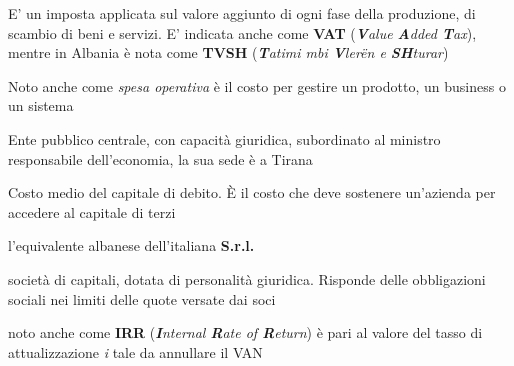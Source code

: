 \begin{acronym}
\begin{multicols}{2}
		   {\newline \small E' un imposta applicata sul valore aggiunto di ogni fase della produzione, di scambio di beni e servizi. E' indicata anche come \textbf{VAT} (\textit{\textbf{V}alue \textbf{A}dded \textbf{T}ax}), mentre in Albania è nota come \textbf{TVSH} (\textit{\textbf{T}atimi mbi \textbf{V}ler\"en e \textbf{SH}turar}) \par}

		   {\newline \small Noto anche come \textit{spesa operativa} è il costo per gestire un prodotto, un business o un sistema \par}

		   {\newline \small Ente pubblico centrale, con capacità giuridica, subordinato al ministro responsabile dell'economia, la sua sede è a Tirana\par}

		   {\newline \small Costo medio del capitale di debito. \`E il costo che deve sostenere un'azienda per accedere al capitale di terzi\par}

		   {\newline \small l'equivalente albanese dell'italiana \textbf{\ac{S.r.l.}}\par}

		   {\newline \small società di capitali, dotata di personalità giuridica. Risponde delle obbligazioni sociali nei limiti delle quote versate dai soci\par}

		   {\newline \small noto anche come \textbf{IRR} (\textit{\textbf{I}nternal \textbf{R}ate of \textbf{R}eturn}) è pari al valore del tasso di attualizzazione \textit{i} tale da annullare il \ac{VAN} \par}		   


\end{multicols}
\end{acronym}
